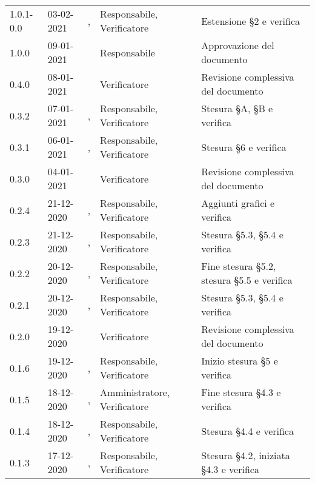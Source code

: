 {{\begin{longtable}{C{1.7cm} | C{2.2cm} | C{3.2cm} | C{3cm} | C{4.8cm}}
1.0.1-0.0 & 03-02-2021 & \PA{}, \SP{} & Responsabile, Verificatore & Estensione \S 2 e verifica\\

1.0.0 & 09-01-2021 & \SG{} & Responsabile & Approvazione del documento \\

0.4.0 & 08-01-2021 & \ZM{} & Verificatore & Revisione complessiva del documento \\

0.3.2 & 07-01-2021 & \BM{}, \ZM{} & Responsabile, Verificatore & Stesura \S A, \S B e verifica \\

0.3.1 & 06-01-2021 & \BM{}, \SH{} & Responsabile, Verificatore & Stesura \S 6 e verifica\\

0.3.0 & 04-01-2021 & \SH{} & Verificatore & Revisione complessiva del documento \\

0.2.4 & 21-12-2020 & \SG{}, \SH{} & Responsabile, Verificatore & Aggiunti grafici  e verifica\\

0.2.3 & 21-12-2020 & \BM{}, \ZM{} & Responsabile, Verificatore & Stesura \S 5.3, \S 5.4 e verifica\\

0.2.2 & 20-12-2020 & \SG{}, \ZM{} & Responsabile, Verificatore & Fine stesura \S 5.2, stesura \S 5.5  e verifica\\

0.2.1 & 20-12-2020 & \BM{}, \ZM{} & Responsabile, Verificatore & Stesura \S 5.3, \S 5.4 e verifica\\

0.2.0 & 19-12-2020 & \ZM{} & Verificatore & Revisione complessiva del documento \\

0.1.6 & 19-12-2020 & \SG{}, \SH{} & Responsabile, Verificatore & Inizio stesura \S 5 e verifica\\

0.1.5 & 18-12-2020 & \PA{}, \SH{} & Amministratore, Verificatore & Fine stesura \S 4.3 e verifica\\

0.1.4 & 18-12-2020 & \SG{}, \ZM{} & Responsabile, Verificatore & Stesura \S 4.4 e verifica \\

0.1.3 & 17-12-2020 & \BM{}, \ZM{} & Responsabile, Verificatore & Stesura \S 4.2, iniziata \S 4.3 e verifica \\


\end{longtable}}}
